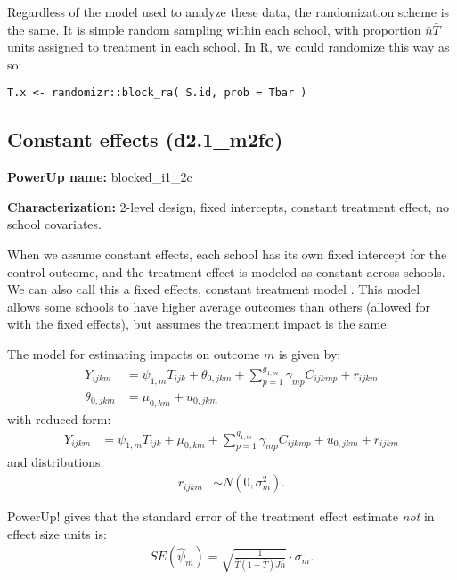 \documentclass[12pt]{article}
\begin{document}
Regardless of the model used to analyze these data, the randomization scheme is the same.
It is simple random sampling within each school, with proportion $\bar{n}\bar{T}$ units assigned to treatment in each school.
In R, we could randomize this way as so:
\begin{verbatim}
T.x <- randomizr::block_ra( S.id, prob = Tbar )
\end{verbatim}



\subsection{Constant effects (d2.1\_m2fc)}

\textbf{PowerUp name:} blocked\_i1\_2c

\textbf{Characterization:} 2-level design, fixed intercepts, constant treatment effect, no school covariates.

When we assume constant effects, each school has its own fixed intercept for the control outcome, and the treatment effect is modeled as constant across schools.
We can also call this a fixed effects, constant treatment model \citep{Miratrix2020}.
This model allows some schools to have higher average outcomes than others (allowed for with the fixed effects), but assumes the treatment impact is the same.

The model for estimating impacts on outcome $m$ is given by:
\begin{align}
Y_{ijkm} &= \psi_{1,m} T_{ijk} + \theta_{0,jkm} + \sum_{p=1}^{g_{1,m}} \gamma_{mp} C_{ijkmp} + r_{ijkm}\\
\nonumber \theta_{0,jkm} &= \mu_{0,km} + u_{0,jkm}
\end{align}
with reduced form:
\begin{align}
Y_{ijkm} &= \psi_{1,m} T_{ijk} + \mu_{0,km} + \sum_{p=1}^{g_{1,m}} \gamma_{mp} C_{ijkmp} + u_{0,jkm} + r_{ijkm}
\end{align}
and distributions:
\begin{align}
r_{ijkm} &\sim N\left(0, \sigma^2_m\right).
\end{align}

PowerUp! gives that the standard error of the treatment effect estimate \emph{not} in effect size units is:
\begin{align}SE( \hat{\psi}_m ) = \sqrt{\frac{1}{\bar{T}(1 - \bar{T}) J \bar{n}}} \cdot \sigma_m .\end{align}
\end{document}
